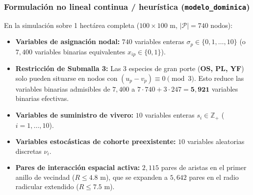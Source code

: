 \documentclass[11pt,a4paper]{article}
\begin{document}
\subsubsection{Formulación no lineal continua / heurística (\texttt{modelo\_dominica})}
En la simulación sobre 1 hectárea completa ($100\times 100\text{ m}$, $|\mathcal{P}| = 740$ nodos):
\begin{itemize}[leftmargin=1.5em]
    \item \textbf{Variables de asignación nodal:} $740$ variables enteras $\sigma_p \in \{0, 1, \dots, 10\}$ (o $7,400$ variables binarias equivalentes $x_{ip} \in \{0, 1\}$).
    \item \textbf{Restricción de Submalla 3:} Las 3 especies de gran porte (\textbf{OS, PL, YF}) solo pueden situarse en nodos con $(u_p - v_p) \equiv 0 \pmod 3$. Esto reduce las variables binarias admisibles de $7,400$ a $7 \cdot 740 + 3 \cdot 247 = \mathbf{5,921}$ variables binarias efectivas.
    \item \textbf{Variables de suministro de vivero:} $10$ variables enteras $s_i \in \mathbb{Z}_+$ ($i=1,\dots,10$).
    \item \textbf{Variables estocásticas de cohorte preexistente:} $10$ variables aleatorias discretas $\nu_i$.
    \item \textbf{Pares de interacción espacial activa:} $2,115$ pares de aristas en el primer anillo de vecindad ($R \le 4.8\text{ m}$), que se expanden a $5,642$ pares en el radio radicular extendido ($R \le 7.5\text{ m}$).
\end{itemize}
\end{document}
